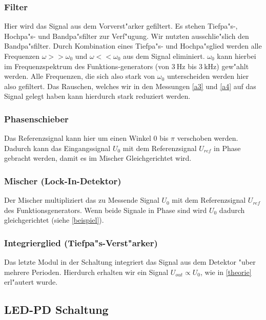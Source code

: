 \documentclass{scrartcl}
\begin{document}
			\subsubsection{Filter}

			Hier wird das Signal aus dem Vorverst"arker gefiltert. Es stehen Tiefpa"s-, Hochpa"s- und Bandpa"sfilter zur Verf"ugung.
			Wir nutzten ausschlie"slich den Bandpa"sfilter. Durch Kombination eines Tiefpa"s- und Hochpa"sglied werden alle Frequenzen
			$\omega >> \omega_0$ und $\omega << \omega_0$ aus dem Signal eliminiert.
			$\omega_0$ kann hierbei im Frequenzspektrum des Funktions-generators (von $\SI{3}{\hertz}$ bis $\SI{3}{\kilo\hertz}$) gew"ahlt werden.
			Alle Frequenzen, die sich also stark von $\omega_0$ unterscheiden werden hier also gefiltert.
			Das Rauschen, welches wir in den Messungen \ref{a3} und \ref{a4} auf das Signal gelegt haben kann hierdurch stark reduziert werden.

			\subsubsection{Phasenschieber}

			Das Referenzsignal kann hier um einen Winkel $0$ bis $\pi$ verschoben werden.
			Dadurch kann das Eingangssignal $U_0$ mit dem Referenzsignal $U_{ref}$ in Phase gebracht werden,
			damit es im Mischer Gleichgerichtet wird.

			\subsubsection{Mischer (Lock-In-Detektor)}

			Der Mischer multipliziert das zu Messende Signal $U_0$ mit dem Referenzsignal $U_{ref}$ des Funktionsgenerators. Wenn beide Signale in Phase sind wird $U_0$ dadurch gleichgerichtet (siehe \ref{beispiel}).

			\subsubsection{Integrierglied (Tiefpa"s-Verst"arker)}

			Das letzte Modul in der Schaltung integriert das Signal aus dem Detektor "uber mehrere Perioden.
			Hierdurch erhalten wir ein Signal $U_{out} \propto U_0$, wie in \ref{theorie} erl"autert wurde.

			\subsection{LED-PD Schaltung}
\end{document}
